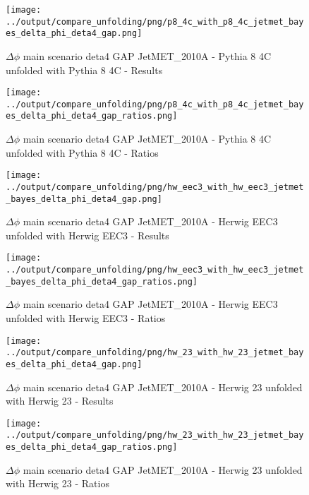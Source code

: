\documentclass[11pt]{book}
\begin{document}
\begin{figure}[ht]
\centering
\texttt{[image: ../output/compare\_unfolding/png/p8\_4c\_with\_p8\_4c\_jetmet\_bayes\_delta\_phi\_deta4\_gap.png]}
\caption{$\Delta\phi$ main scenario deta4 GAP JetMET\_2010A - Pythia 8 4C unfolded with Pythia 8 4C - Results}
\label{p8_p8_jetmet_bayes_delta_phi_deta4_gap_a}
\end{figure}

\begin{figure}[ht]
\centering
\texttt{[image: ../output/compare\_unfolding/png/p8\_4c\_with\_p8\_4c\_jetmet\_bayes\_delta\_phi\_deta4\_gap\_ratios.png]}
\caption{$\Delta\phi$ main scenario deta4 GAP JetMET\_2010A - Pythia 8 4C unfolded with Pythia 8 4C - Ratios}
\label{p8_p8_jetmet_bayes_delta_phi_deta4_gap_b}
\end{figure}

\begin{figure}[ht]
\centering
\texttt{[image: ../output/compare\_unfolding/png/hw\_eec3\_with\_hw\_eec3\_jetmet\_bayes\_delta\_phi\_deta4\_gap.png]}
\caption{$\Delta\phi$ main scenario deta4 GAP JetMET\_2010A - Herwig EEC3 unfolded with Herwig EEC3 - Results}
\label{hw_eec3_hw_eec3_jetmet_bayes_delta_phi_deta4_gap_a}
\end{figure}

\begin{figure}[ht]
\centering
\texttt{[image: ../output/compare\_unfolding/png/hw\_eec3\_with\_hw\_eec3\_jetmet\_bayes\_delta\_phi\_deta4\_gap\_ratios.png]}
\caption{$\Delta\phi$ main scenario deta4 GAP JetMET\_2010A - Herwig EEC3 unfolded with Herwig EEC3 - Ratios}
\label{hw_eec3_hw_eec3_jetmet_bayes_delta_phi_deta4_gap_b}
\end{figure}

\begin{figure}[ht]
\centering
\texttt{[image: ../output/compare\_unfolding/png/hw\_23\_with\_hw\_23\_jetmet\_bayes\_delta\_phi\_deta4\_gap.png]}
\caption{$\Delta\phi$ main scenario deta4 GAP JetMET\_2010A - Herwig 23 unfolded with Herwig 23 - Results}
\label{hw_23_hw_23_jetmet_bayes_delta_phi_deta4_gap_a}
\end{figure}

\begin{figure}[ht]
\centering
\texttt{[image: ../output/compare\_unfolding/png/hw\_23\_with\_hw\_23\_jetmet\_bayes\_delta\_phi\_deta4\_gap\_ratios.png]}
\caption{$\Delta\phi$ main scenario deta4 GAP JetMET\_2010A - Herwig 23 unfolded with Herwig 23 - Ratios}
\label{hw_23_hw_23_jetmet_bayes_delta_phi_deta4_gap_b}
\end{figure}
\end{document}

